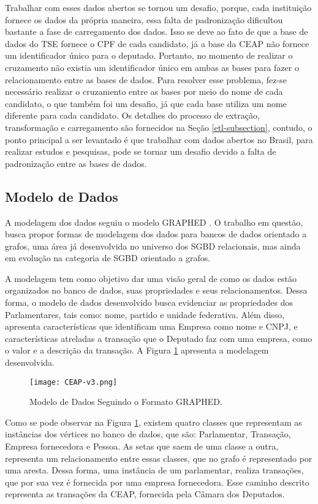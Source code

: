 Trabalhar com esses dados abertos se tornou um desafio, porque, cada instituição fornece os dados da própria maneira, essa falta de padronização dificultou bastante a fase de carregamento dos dados. Isso se deve ao fato de que a base de dados do TSE fornece o CPF de cada candidato, já a base da CEAP não fornece um identificador único para o deputado. Portanto, no momento de realizar o cruzamento não existia um identificador único em ambas as bases para fazer o relacionamento entre as bases de dados. Para resolver esse problema, fez-se necessário realizar o cruzamento entre as bases por meio do nome de cada candidato, o que também foi um desafio, já que cada base utiliza um nome diferente para cada candidato. Os detalhes do processo de extração, transformação e carregamento são fornecidos na Seção \ref{etl-subsection}, contudo, o ponto principal a ser levantado é que trabalhar com dados abertos no Brasil, para realizar estudos e pesquisas, pode se tornar um desafio devido a falta de padronização entre as bases de dados. 

\subsection{Modelo de Dados}

A modelagem dos dados seguiu o modelo GRAPHED \cite{graphed}. O trabalho em questão, busca propor formas de modelagem dos dados para bancos de dados orientado a grafos, uma área já desenvolvida no universo dos SGBD relacionais, mas ainda em evolução na categoria de SGBD orientado a grafos.

A modelagem tem como objetivo dar uma visão geral de como os dados estão organizados no banco de dados, suas propriedades e seus relacionamentos. Dessa forma, o modelo de dados desenvolvido busca evidenciar as propriedades dos Parlamentares, tais como: nome, partido e unidade federativa. Além disso, apresenta características que identificam uma Empresa como nome e CNPJ, e características atreladas a transação que o Deputado faz com uma empresa, como o valor e a descrição da transação. A Figura \ref{fig:modeloDeDados} apresenta a modelagem  desenvolvida.

\begin{figure}[H]
\centering
\texttt{[image: CEAP-v3.png]}
\caption{Modelo de Dados Seguindo o Formato GRAPHED.}
\label{fig:modeloDeDados}
\end{figure}

Como se pode observar na Figura \ref{fig:modeloDeDados}, existem quatro classes que representam as instâncias dos vértices no banco de dados, que são: Parlamentar, Transação, Empresa fornecedora e Pessoa. As setas que saem de uma classe a outra, representa um relacionamento entre essas classes, que no grafo é representado por uma aresta. Dessa forma, uma instância de um parlamentar, realiza transações, que por sua vez é fornecida por uma empresa fornecedora. Esse caminho descrito representa as transações da CEAP, fornecida pela Câmara dos Deputados.

